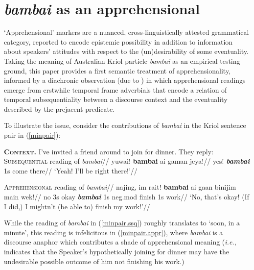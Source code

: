 

%
\chapter{\textit{bambai} as an apprehensional}\label{bambai.desc}



	`Apprehensional' markers are a nuanced, cross-linguistically attested grammatical category, reported to encode epistemic possibility in addition to information about speakers' attitudes with respect to the (un)desirability of some eventuality. Taking the meaning of Australian Kriol particle \textit{bambai} as an empirical testing ground, this paper provides a first semantic treatment of apprehensionality, informed by a diachronic observation (due to \citealp{Angelo2016}) in which apprehensional readings emerge from erstwhile temporal frame adverbials that encode a relation of temporal {\sc subsequentiality} between a discourse context and the eventuality described by the prejacent predicate.

To illustrate the issue, consider the contributions of \textit{bambai} in the Kriol sentence pair in (\ref{minpair}):

\pex\label{minpair}\textbf{\textsc{Context.}} \textup{I've invited a friend around to join for dinner. They reply:}
	\a\label{minpair.ssq}\begingl\glpreamble\textsc{Subsequential} reading of \textit{bambai}//
		\gla yuwai! \textbf{bambai} ai gaman jeya!//
		\glb yes! \textbf{\textit{bambai}} 1s come there//
		\glft ‘Yeah! I’ll be right there!’//\endgl
		
	\a\begingl\glpreamble \label{minpair.appr}\textsc{Apprehensional} reading of \textit{bambai}//
		\gla najing, im rait! \textbf{bambai} ai gaan binijim main wek!//
		\glb no 3s okay \textbf{\textit{bambai}} 1s {\sc neg.mod} finish 1s work//
		\glft ‘No, that’s okay! (If I did,) I mightn’t (be able to) finish my work!'\trailingcitation{[GT~20170316]}//\endgl
\xe


While the reading of \textit{bambai} in (\ref{minpair.ssq}) roughly translates to `soon, in a minute', this reading is infelicitous in (\ref{minpair.appr}), where \textit{bambai} is a discourse anaphor which contributes a shade of apprehensional meaning (\textit{i.e.}, indicates that the Speaker's hypothetically joining for dinner may have the undesirable possible outcome of him not finishing his work.) 

